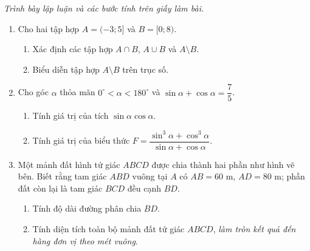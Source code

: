 \documentclass[12pt,a4paper]{article}
\newcommand{\parttitle}[1]{\par\vspace{3pt}{\large\bfseries\color{ink}#1}\par\vspace{2pt}}
\begin{document}
\par\vspace{8pt}
\parttitle{PHẦN IV. Tự luận}
\textit{Trình bày lập luận và các bước tính trên giấy làm bài.}
\begin{enumerate}
\item Cho hai tập hợp $A = (-3; 5]$ và $B = [0; 8)$.
\begin{enumerate}
\item Xác định các tập hợp $A \cap B$, $A \cup B$ và $A \setminus B$.
\item Biểu diễn tập hợp $A \setminus B$ trên trục số.
\end{enumerate}
\item Cho góc $\alpha$ thỏa mãn $0^\circ < \alpha < 180^\circ$ và $\sin\alpha + \cos\alpha = \dfrac{7}{5}$.
\begin{enumerate}
\item Tính giá trị của tích $\sin\alpha\cos\alpha$.
\item Tính giá trị của biểu thức $F = \dfrac{\sin^3\alpha + \cos^3\alpha}{\sin\alpha + \cos\alpha}$.
\end{enumerate}
\item \begin{minipage}[t]{0.56\linewidth}
Một mảnh đất hình tứ giác $ABCD$ được chia thành hai phần như hình vẽ bên. Biết rằng tam giác $ABD$ vuông tại $A$ có $AB = 60\text{ m}$, $AD = 80\text{ m}$; phần đất còn lại là tam giác $BCD$ đều cạnh $BD$.
\begin{enumerate}
\item Tính độ dài đường phân chia $BD$.
\item Tính diện tích toàn bộ mảnh đất tứ giác $ABCD$, \textit{làm tròn kết quả đến hàng đơn vị theo mét vuông}.
\end{enumerate}
\end{minipage}\hfill%
\begin{minipage}[t]{0.42\linewidth}
\vspace{-0.3\baselineskip}
\centering
{}
\end{minipage}
\end{enumerate}
\end{document}
